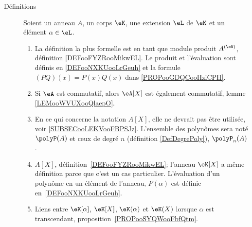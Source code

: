 

\begin{description}
	\item[Définitions]
	      Soient un anneau \( A\), un corps \( \eK\), une extension \( \eL\) de \( \eK\) et un élément \( \alpha\in \eL\).
	      \begin{enumerate}
		      \item
		            La définition la plus formelle est en tant que module produit \( A^{(\eN)}\), définition \ref{DEFooFYZRooMikwEL}. Le produit et l'évaluation sont définis en \ref{DEFooNXKUooLrGeuh} et la formule \( (PQ)(x)=P(x)Q(x)\) dans \ref{PROPooGDQCooHziCPH}.
		      \item
		            Si \( \eA\) est commutatif, alors \( \eA[X]\) est également commutatif, lemme \ref{LEMooWVUXooQlaepO}.
		      \item
		            En ce qui concerne la notation \( A[X]\), elle ne devrait pas être utilisée, voir \ref{SUBSECooLEKVooFBPSJz}. L'ensemble des polynômes sera noté \( \polyP(A)\) et ceux de degré \( n\) (définition \ref{DefDegrePoly}), \( \polyP_n(A)\).
		      \item
		            \( A[X]\), définition~\ref{DEFooFYZRooMikwEL}; l'anneau \( \eK[X]\) a même définition parce que c'est un cas particulier. L'évaluation d'un polynôme en un élément de l'anneau, \( P(\alpha)\) est définie en~\ref{DEFooNXKUooLrGeuh}.
		      \item
		            Liens entre \( \eK[\alpha]\), \( \eK[X]\), \( \eK(\alpha)\) et \( \eK(X)\) lorsque \( \alpha\) est transcendant, proposition~\ref{PROPooSYQWooFbfQtm}.


\end{enumerate}
\end{description}
